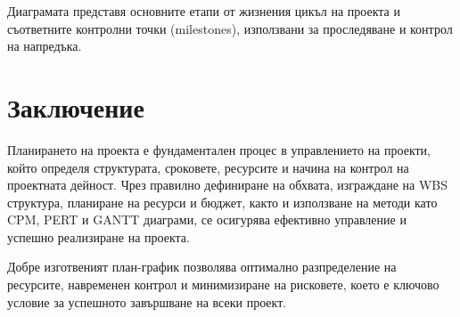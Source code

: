 \documentclass{scrartcl}
\begin{document}
\begin{FlushLeft}
\begin{center}
{\begin{tikzpicture}
\end{tikzpicture}
}
\end{center}

Диаграмата представя основните етапи от жизнения цикъл на проекта и съответните контролни точки (milestones), използвани за проследяване и контрол на напредъка.

\section{Заключение}

Планирането на проекта е фундаментален процес в управлението на проекти, който определя структурата, сроковете, ресурсите и начина на контрол на проектната дейност. Чрез правилно дефиниране на обхвата, изграждане на WBS структура, планиране на ресурси и бюджет, както и използване на методи като CPM, PERT и GANTT диаграми, се осигурява ефективно управление и успешно реализиране на проекта.

Добре изготвеният план-график позволява оптимално разпределение на ресурсите, навременен контрол и минимизиране на рисковете, което е ключово условие за успешното завършване на всеки проект.

\end{FlushLeft}
\end{document}
